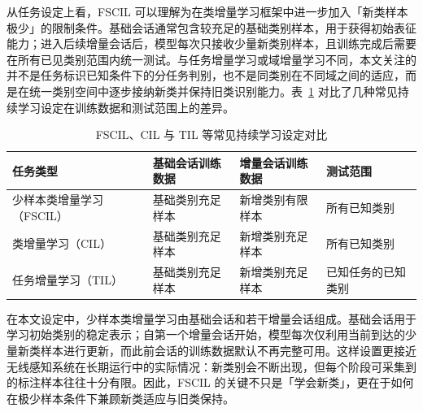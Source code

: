 从任务设定上看，FSCIL 可以理解为在类增量学习框架中进一步加入「新类样本极少」的限制条件\cite{zhou2024cil,tian2024fscilsurvey,tao2020topic}。基础会话通常包含较充足的基础类别样本，用于获得初始表征能力；进入后续增量会话后，模型每次只接收少量新类别样本，且训练完成后需要在所有已见类别范围内统一测试。与任务增量学习或域增量学习不同，本文关注的并不是任务标识已知条件下的分任务判别，也不是同类别在不同域之间的适应，而是在统一类别空间中逐步接纳新类并保持旧类识别能力\cite{zhou2024cil,tian2024fscilsurvey,tao2020topic}。表~\ref{tab:fscil-paradigm-compare} 对比了几种常见持续学习设定在训练数据和测试范围上的差异。

\begin{table}[h]
  \caption{FSCIL、CIL 与 TIL 等常见持续学习设定对比}
  \label{tab:fscil-paradigm-compare}
  \begingroup
  \renewcommand{\tabularxcolumn}[1]{m{#1}}
  \begin{tabularx}{\textwidth}{XXXX}
  \toprule
  任务类型 & 基础会话训练数据 & 增量会话训练数据 & 测试范围 \\
  \midrule
  少样本类增量学习（FSCIL） & 基础类别充足样本 & 新增类别有限样本 & 所有已知类别 \\
  类增量学习（CIL） & 基础类别充足样本 & 新增类别充足样本 & 所有已知类别 \\
  任务增量学习（TIL） & 基础类别充足样本 & 新增类别充足样本 & 已知任务的已知类别 \\
  \bottomrule
  \end{tabularx}
  \endgroup
\end{table}

在本文设定中，少样本类增量学习由基础会话和若干增量会话组成。基础会话用于学习初始类别的稳定表示；自第一个增量会话开始，模型每次仅利用当前到达的少量新类样本进行更新，而此前会话的训练数据默认不再完整可用。这样设置更接近无线感知系统在长期运行中的实际情况：新类别会不断出现，但每个阶段可采集到的标注样本往往十分有限。因此，FSCIL 的关键不只是「学会新类」，更在于如何在极少样本条件下兼顾新类适应与旧类保持。

